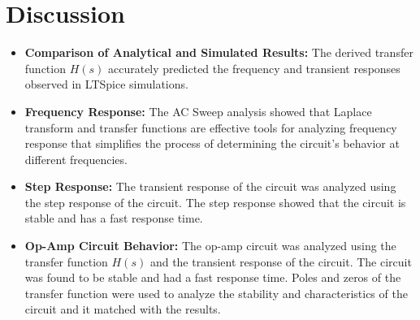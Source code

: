 \chapter{Discussion}

\begin{itemize}
    \item \textbf{Comparison of Analytical and Simulated Results:} The derived transfer function $H(s)$ accurately predicted the frequency and transient responses observed in LTSpice simulations.
    \item \textbf{Frequency Response:} The AC Sweep analysis showed that Laplace transform and transfer functions are effective tools for analyzing frequency response that simplifies the process of determining the circuit's behavior at different frequencies.
    \item \textbf{Step Response:} The transient response of the circuit was analyzed using the step response of the circuit. The step response showed that the circuit is stable and has a fast response time.
    \item \textbf{Op-Amp Circuit Behavior:} The op-amp circuit was analyzed using the transfer function $H(s)$ and the transient response of the circuit. The circuit was found to be stable and had a fast response time. Poles and zeros of the transfer function were used to analyze the stability and characteristics of the circuit and it matched with the results.
\end{itemize}

